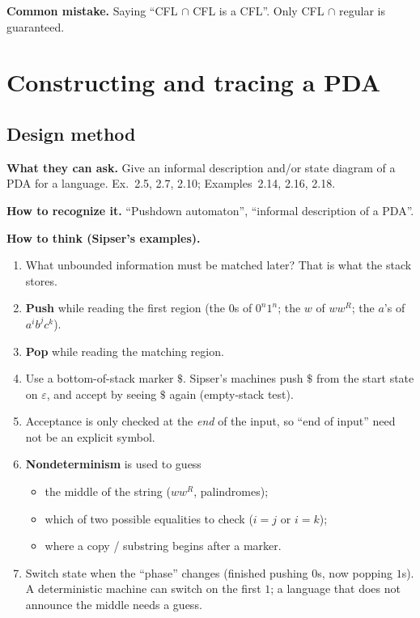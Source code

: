 \documentclass[11pt,a4paper]{article}
\newcommand{\eps}{\varepsilon}
\begin{document}
\textbf{Common mistake.}
Saying ``CFL $\cap$ CFL is a CFL''. Only CFL $\cap$ regular is
guaranteed.

\section{Constructing and tracing a PDA}
\label{type:pda}

\subsection{Design method}

\textbf{What they can ask.}
Give an informal description and/or state diagram of a PDA for a
language. Ex.~2.5, 2.7, 2.10; Examples~2.14, 2.16, 2.18.

\textbf{How to recognize it.}
``Pushdown automaton'', ``informal description of a PDA''.

\textbf{How to think (Sipser's examples).}
\begin{enumerate}
  \item What unbounded information must be matched later? That is
        what the stack stores.
  \item \textbf{Push} while reading the first region (the $0$s of
        $0^n1^n$; the $w$ of $ww^R$; the $a$'s of $a^ib^jc^k$).
  \item \textbf{Pop} while reading the matching region.
  \item Use a bottom-of-stack marker $\$$. Sipser's machines push
        $\$$ from the start state on $\eps$, and accept by seeing
        $\$$ again (empty-stack test).
  \item Acceptance is only checked at the \emph{end} of the input,
        so ``end of input'' need not be an explicit symbol.
  \item \textbf{Nondeterminism} is used to guess
        \begin{itemize}[nosep]
          \item the middle of the string ($ww^R$, palindromes);
          \item which of two possible equalities to check
                ($i=j$ or $i=k$);
          \item where a copy / substring begins after a marker.
        \end{itemize}
  \item Switch state when the ``phase'' changes (finished pushing
        $0$s, now popping $1$s). A deterministic machine can switch
        on the first $1$; a language that does not announce the
        middle needs a guess.
\end{enumerate}
\end{document}

